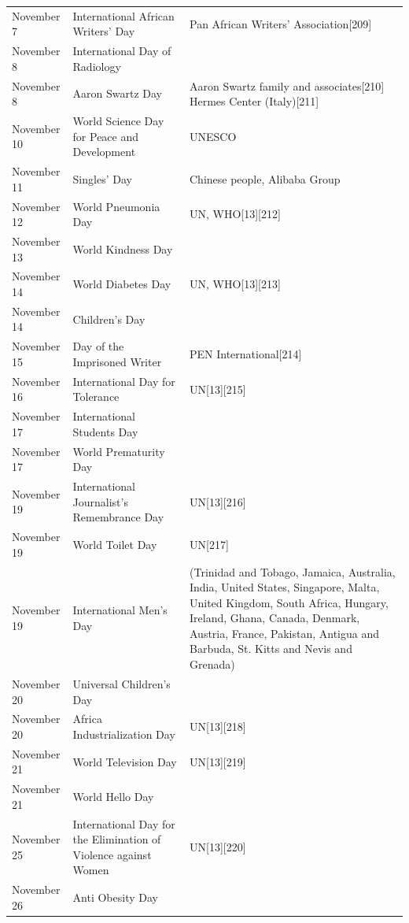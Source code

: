 \documentclass[
  openany]{book}
\begin{document}
\begin{longtable}[t]{>{\raggedright\arraybackslash}p{8em}>{\raggedright\arraybackslash}p{20em}>{\raggedright\arraybackslash}p{12em}}
\rowcolor{gray!6}  November 7 & International African Writers' Day & Pan African Writers' Association[209]\\
November 8 & International Day of Radiology & \\
\addlinespace
\rowcolor{gray!6}  November 8 & Aaron Swartz Day & Aaron Swartz family and associates[210] Hermes Center (Italy)[211]\\
November 10 & World Science Day for Peace and Development & UNESCO\\
\rowcolor{gray!6}  November 11 & Singles' Day & Chinese people, Alibaba Group\\
November 12 & World Pneumonia Day & UN, WHO[13][212]\\
\rowcolor{gray!6}  November 13 & World Kindness Day \vphantom{1} & \\
\addlinespace
November 14 & World Diabetes Day & UN, WHO[13][213]\\
\rowcolor{gray!6}  November 14 & Children's Day & \\
November 15 & Day of the Imprisoned Writer & PEN International[214]\\
\rowcolor{gray!6}  November 16 & International Day for Tolerance & UN[13][215]\\
November 17 & International Students Day & \\
\addlinespace
\rowcolor{gray!6}  November 17 & World Prematurity Day & \\
November 19 & International Journalist's Remembrance Day & UN[13][216]\\
\rowcolor{gray!6}  November 19 & World Toilet Day & UN[217]\\
November 19 & International Men's Day & (Trinidad and Tobago, Jamaica, Australia, India, United States, Singapore, Malta, United Kingdom, South Africa, Hungary, Ireland, Ghana, Canada, Denmark, Austria, France, Pakistan, Antigua and Barbuda, St. Kitts and Nevis and Grenada)\\
\rowcolor{gray!6}  November 20 & Universal Children's Day & \\
\addlinespace
November 20 & Africa Industrialization Day & UN[13][218]\\
\rowcolor{gray!6}  November 21 & World Television Day & UN[13][219]\\
November 21 & World Hello Day & \\
\rowcolor{gray!6}  November 25 & International Day for the Elimination of Violence against Women & UN[13][220]\\
November 26 & Anti Obesity Day & \\

\end{longtable}
\end{document}
